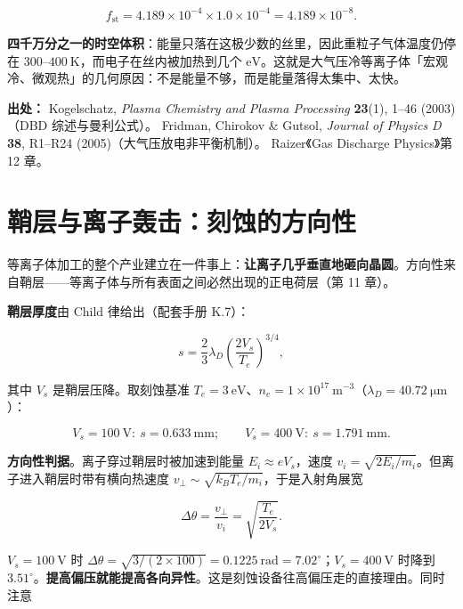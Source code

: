 \begin{equation}
  f_{\mathrm{st}} = 4.189\times10^{-4}\times1.0\times10^{-4} = 4.189\times10^{-8}.
  \label{eq:app-p-fillfactor}
\end{equation}

\textbf{四千万分之一的时空体积}：能量只落在这极少数的丝里，因此重粒子气体温度仍停在 $300$--$400\ \mathrm{K}$，而电子在丝内被加热到几个 $\mathrm{eV}$。这就是大气压冷等离子体「宏观冷、微观热」的几何原因：不是能量不够，而是能量落得太集中、太快。

{\footnotesize
\textbf{出处：} Kogelschatz, \emph{Plasma Chemistry and Plasma Processing} \textbf{23}(1), 1--46 (2003)（DBD 综述与曼利公式）。
Fridman, Chirokov \& Gutsol, \emph{Journal of Physics D} \textbf{38}, R1--R24 (2005)（大气压放电非平衡机制）。
Raizer《Gas Discharge Physics》第 12 章。
}

\section{鞘层与离子轰击：刻蚀的方向性}
\label{sec:app-p-sheath}

等离子体加工的整个产业建立在一件事上：\textbf{让离子几乎垂直地砸向晶圆}。方向性来自鞘层——等离子体与所有表面之间必然出现的正电荷层（第 11 章）。

\textbf{鞘层厚度}由 Child 律给出（配套手册 K.7）：

\begin{equation}
  s = \frac{2}{3}\lambda_D\left(\frac{2V_s}{T_e}\right)^{3/4},
  \label{eq:app-p-child}
\end{equation}

其中 $V_s$ 是鞘层压降。取刻蚀基准 $T_e=3\ \mathrm{eV}$、$n_e=1\times10^{17}\ \mathrm{m}^{-3}$（$\lambda_D=40.72\ \mathrm{\mu m}$）：

\begin{equation}
  V_s = 100\ \mathrm{V}:\ s = 0.633\ \mathrm{mm}; \qquad
  V_s = 400\ \mathrm{V}:\ s = 1.791\ \mathrm{mm}.
  \label{eq:app-p-sheathnum}
\end{equation}

\textbf{方向性判据}。离子穿过鞘层时被加速到能量 $E_i\approx eV_s$，速度 $v_i=\sqrt{2E_i/m_i}$。但离子进入鞘层时带有横向热速度 $v_\perp\sim\sqrt{k_BT_e/m_i}$，于是入射角展宽

\begin{equation}
  \Delta\theta = \frac{v_\perp}{v_i} = \sqrt{\frac{T_e}{2V_s}}.
  \label{eq:app-p-angle}
\end{equation}

$V_s=100\ \mathrm{V}$ 时 $\Delta\theta = \sqrt{3/(2\times100)} = 0.1225\ \mathrm{rad} = 7.02^\circ$；$V_s=400\ \mathrm{V}$ 时降到 $3.51^\circ$。\textbf{提高偏压就能提高各向异性}。这是刻蚀设备往高偏压走的直接理由。同时注意

